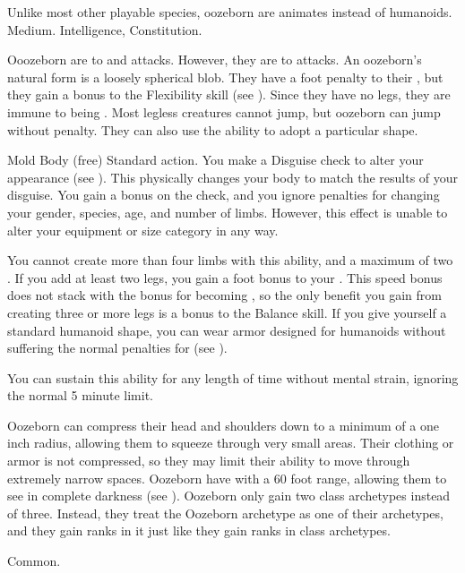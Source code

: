    Unlike most other playable species, oozeborn are animates instead of humanoids.
   Medium.
    Intelligence,  Constitution.
  \begin{raggeditemize}
     Ooozeborn are  to \atAcid and \atPoison attacks. However, they are  to \atEarth attacks.
     An oozeborn's natural form is a loosely spherical blob.
      They have a  foot penalty to their , but they gain a  bonus to the Flexibility skill (see ).
      Since they have no legs, they are immune to being \prone.
      Most legless creatures cannot jump, but oozeborn can jump without penalty.
      They can also use the  ability to adopt a particular shape.
      \begin{sustainability}{Mold Body}{ (free)}
        \abilityusagetime Standard action.
        \rankline
        You make a Disguise check to alter your appearance (see ).
        This physically changes your body to match the results of your disguise.
        You gain a  bonus on the check, and you ignore penalties for changing your gender, species, age, and number of limbs.
        However, this effect is unable to alter your equipment or size category in any way.

        You cannot create more than four limbs with this ability, and a maximum of two .
        If you add at least two legs, you gain a  foot bonus to your .
        This speed bonus does not stack with the bonus for becoming , so the only benefit you gain from creating three or more legs is a  bonus to the Balance skill.
        If you give yourself a standard humanoid shape, you can wear armor designed for humanoids without suffering the normal penalties for  (see ).

        You can sustain this ability for any length of time without mental strain, ignoring the normal 5 minute limit.
      \end{sustainability}
     Oozeborn can compress their head and shoulders down to a minimum of a one inch radius, allowing them to squeeze through very small areas.
      Their clothing or armor is not compressed, so they may limit their ability to move through extremely narrow spaces.
     Oozeborn have  with a 60 foot range, allowing them to see in complete darkness (see ).
     Oozeborn only gain two class archetypes instead of three.
      Instead, they treat the Oozeborn archetype as one of their archetypes, and they gain ranks in it just like they gain ranks in class archetypes.
  \end{raggeditemize}
   Common.

